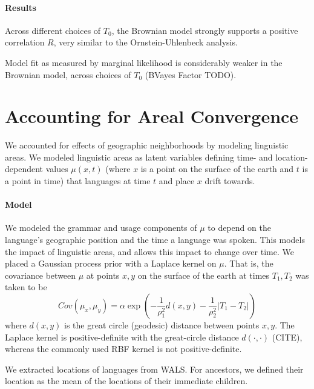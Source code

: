 \documentclass[11pt,a4paper]{article}
\begin{document}
\paragraph{Results}
Across different choices of $T_0$, the Brownian model strongly supports a positive correlation $R$, very similar to the Ornstein-Uhlenbeck analysis.

Model fit as measured by marginal likelihood is considerably weaker in the Brownian model, across choices of $T_0$ (BVayes Factor TODO).



\section{Accounting for Areal Convergence}
We accounted for effects of geographic neighborhoods by modeling linguistic areas.
We modeled linguistic areas as latent variables defining time- and location-dependent values $\mu(x,t)$ (where $x$ is a point on the surface of the earth and $t$ is a point in time) that languages at time $t$ and place $x$ drift towards.

\paragraph{Model}
We modeled the grammar and usage components of $\mu$ to depend on the language's geographic position and the time a language was spoken.
This models the impact of linguistic areas, and allows this impact to change over time.
We placed a Gaussian process prior with a Laplace kernel on $\mu$.
That is, the covariance between $\mu$ at points $x, y$ on the surface of the earth at times $T_1, T_2$ was taken to be
\begin{equation}\label{eq:kernel}
    Cov(\mu_x, \mu_y) = \alpha \exp\left(-\frac{1}{\rho^2_1} d(x,y) - \frac{1}{\rho_2^2} |T_1-T_2|\right)
\end{equation}
where $d(x,y)$ is the great circle (geodesic) distance between points $x, y$.
The Laplace kernel is positive-definite with the great-circle distance $d(\cdot, \cdot)$ (CITE), whereas the commonly used RBF kernel is not positive-definite.

We extracted locations of languages from WALS.
For ancestors, we defined their location as the mean of the locations of their immediate children.
\end{document}

